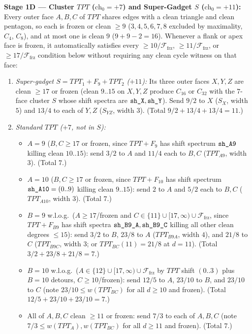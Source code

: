 \documentclass[11pt,reqno]{amsart}
\theoremstyle{plain}
\theoremstyle{definition}
\theoremstyle{remark}
\newcommand{\chz}{\mathrm{ch}_0}
\newcommand{\Ffrz}{\mathcal{F}_{\mathrm{frz}}}
\DeclareRobustCommand{\_}{\ifmmode\text{\textunderscore}\else\textunderscore\allowbreak\fi}
\begin{document}
\begin{enumerate}[label=(TP\arabic*),leftmargin=3.2em]
\begin{itemize}[leftmargin=1.5em]
  \end{itemize}
\end{enumerate}

\noindent\textbf{Stage 1D --- Cluster $TPT$ ($\chz = +7$) and Super-Gadget $S$ ($\chz = +11$):}
Every outer face $A, B, C$ of $TPT$ shares edges with a clean triangle and clean pentagon, so each is frozen or clean $\ge 9$ ($3, 4, 5, 6, 7, 8$ excluded by maximality, $C_4$, $C_8$), and at most one is clean $9$ ($9+9-2=16$). Whenever a flank or apex face is frozen, it automatically satisfies every $\ge 10/\Ffrz$, $\ge 11/\Ffrz$, or $\ge 17/\Ffrz$ condition below without requiring any clean cycle witness on that face:
\begin{enumerate}[label=(TPT\arabic*),leftmargin=3.6em]
  \item \emph{Super-gadget $S = TPT_1 + F_9 + TPT_2$ ($+11$):} Its three outer faces $X, Y, Z$ are clean $\ge 17$ or frozen (clean $9..15$ on $X, Y, Z$ produce $C_{16}$ or $C_{32}$ with the $7$-face cluster $S$ whose shift spectra are $\texttt{sh\_X}, \texttt{sh\_Y}$). Send $9/2$ to $X$ ($S_X$, width $5$) and $13/4$ to each of $Y, Z$ ($S_{YZ}$, width $3$). (Total $9/2 + 13/4 + 13/4 = 11$.)
  \item \emph{Standard $TPT$ ($+7$, not in $S$):}
  \begin{itemize}[leftmargin=1.5em]
    \item $A = 9$ ($B, C \ge 17$ or frozen, since $TPT + F_9$ has shift spectrum $\texttt{sh\_A9}$ killing clean $10..15$): send $3/2$ to $A$ and $11/4$ each to $B, C$ ($TPT_{A9}$, width $3$). (Total $7$.)
    \item $A = 10$ ($B, C \ge 17$ or frozen, since $TPT + F_{10}$ has shift spectrum $\texttt{sh\_A10} = (0..9)$ killing clean $9..15$): send $2$ to $A$ and $5/2$ each to $B, C$ ($TPT_{A10}$, width $3$). (Total $7$.)
    \item $B = 9$ w.l.o.g.\ ($A \ge 17$/frozen and $C \in \{11\} \cup [17,\infty) \cup \Ffrz$, since $TPT + F_{B9}$ has shift spectra $\texttt{sh\_B9\_A}, \texttt{sh\_B9\_C}$ killing all other clean degrees $\le 15$): send $3/2$ to $B$, $23/8$ to $A$ ($TPT_{B9A}$, width $4$), and $21/8$ to $C$ ($TPT_{B9C}$, width $3$; or $TPT_{BC}(11)=21/8$ at $d=11$). (Total $3/2 + 23/8 + 21/8 = 7$.)
    \item $B = 10$ w.l.o.g.\ ($A \in \{12\} \cup [17,\infty) \cup \Ffrz$ by $TPT$ shift $(0..3)$ plus $B=10$ detours, $C \ge 10$/frozen): send $12/5$ to $A$, $23/10$ to $B$, and $23/10$ to $C$ (note $23/10 \le w(TPT_{BC})$ for all $d \ge 10$ and frozen). (Total $12/5 + 23/10 + 23/10 = 7$.)
    \item All of $A, B, C$ clean $\ge 11$ or frozen: send $7/3$ to each of $A, B, C$ (note $7/3 \le w(TPT_A), w(TPT_{BC})$ for all $d \ge 11$ and frozen). (Total $7$.)
  \end{itemize}
\end{enumerate}
\end{document}
